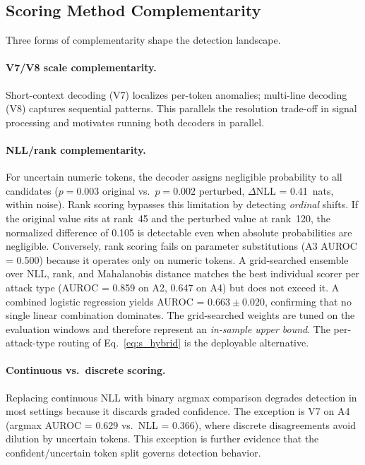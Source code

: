 \subsection{Scoring Method Complementarity}
\label{sec:disc_multiscale}

Three forms of complementarity shape the detection landscape.

\paragraph{V7/V8 scale complementarity.}
Short-context decoding (V7) localizes per-token anomalies; multi-line decoding (V8) captures sequential patterns.
This parallels the resolution trade-off in signal processing and motivates running both decoders in parallel.

\paragraph{NLL/rank complementarity.}
For uncertain numeric tokens, the decoder assigns negligible probability to all candidates ($p = 0.003$ original vs.\ $p = 0.002$ perturbed, $\Delta$NLL = 0.41~nats, within noise).
Rank scoring bypasses this limitation by detecting \emph{ordinal} shifts.
If the original value sits at rank~45 and the perturbed value at rank~120, the normalized difference of 0.105 is detectable even when absolute probabilities are negligible.
Conversely, rank scoring fails on parameter substitutions (A3 AUROC = 0.500) because it operates only on numeric tokens.
A grid-searched ensemble over NLL, rank, and Mahalanobis distance matches the best individual scorer per attack type (AUROC = 0.859 on A2, 0.647 on A4) but does not exceed it.
A combined logistic regression yields AUROC = $0.663 \pm 0.020$, confirming that no single linear combination dominates.
The grid-searched weights are tuned on the evaluation windows and therefore represent an \emph{in-sample upper bound}.
The per-attack-type routing of Eq.~\ref{eq:s_hybrid} is the deployable alternative.

\paragraph{Continuous vs.\ discrete scoring.}
Replacing continuous NLL with binary argmax comparison degrades detection in most settings because it discards graded confidence.
The exception is V7 on A4 (argmax AUROC = 0.629 vs.\ NLL = 0.366), where discrete disagreements avoid dilution by uncertain tokens.
This exception is further evidence that the confident/uncertain token split governs detection behavior.

